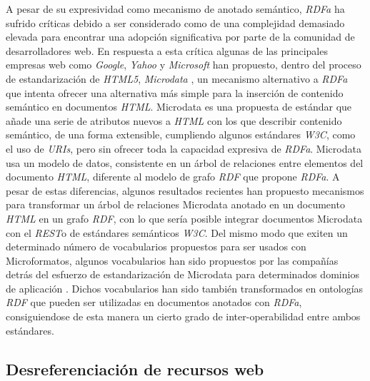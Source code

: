 A pesar de su expresividad como mecanismo de anotado sem\'antico, \textit{RDFa} ha sufrido cr\'iticas debido a ser considerado como de una complejidad demasiado elevada para encontrar una adopci\'on significativa por parte de la comunidad de desarrolladores web. En respuesta a esta cr\'itica algunas de las principales empresas web como \textit{Google}, \textit{Yahoo} y \textit{Microsoft} han propuesto, dentro del proceso de estandarizaci\'on de \textit{HTML5},  \textit{Microdata} \cite{microdata}, un mecanismo alternativo a \textit{RDFa} que intenta ofrecer una alternativa m\'as simple para la inserci\'on de contenido sem\'antico en documentos \textit{HTML}. Microdata es una propuesta de est\'andar que a\~nade una serie de atributos nuevos a \textit{HTML} con los que describir contenido sem\'antico, de una forma extensible, cumpliendo algunos est\'andares \textit{W3C}, como el uso de \textit{URIs}, pero sin ofrecer toda la capacidad expresiva de \textit{RDFa}. Microdata usa un modelo de datos, consistente en un \'arbol de relaciones entre elementos del documento \textit{HTML}, diferente al modelo de grafo \textit{RDF} que propone \textit{RDFa}. A pesar de estas diferencias, algunos resultados recientes \cite{hickson2012microdata} han propuesto mecanismos para transformar un \'arbol de relaciones Microdata anotado en un documento \textit{HTML} en un grafo \textit{RDF}, con lo que ser\'ia posible integrar documentos Microdata con el \textit{REST}o de est\'andares sem\'anticos \textit{W3C}. Del mismo modo que exiten un determinado n\'umero de vocabularios propuestos para ser usados con Microformatos, algunos vocabularios han sido propuestos por las compa\~n\'ias detr\'as del esfuerzo de estandarizaci\'on de Microdata para determinados dominios de aplicaci\'on \cite{ronallo2012html5}. Dichos vocabularios han sido tambi\'en transformados en ontolog\'ias \textit{RDF} que pueden ser utilizadas en documentos anotados con \textit{RDFa}, consiguiendose de esta manera un cierto grado de inter-operabilidad entre ambos est\'andares.\\

\subsection{Desreferenciaci\'on de recursos web}

